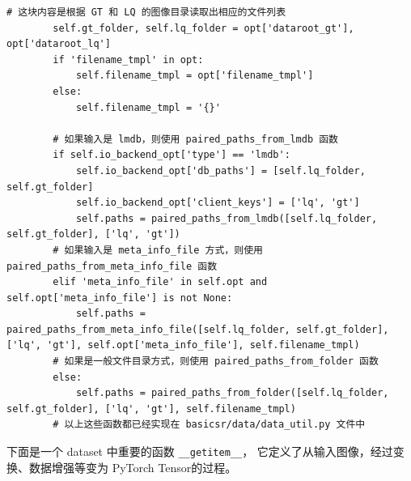 \documentclass[../main.tex]{subfiles}
\begin{document}
\begin{verbatim}
# 这块内容是根据 GT 和 LQ 的图像目录读取出相应的文件列表
        self.gt_folder, self.lq_folder = opt['dataroot_gt'], opt['dataroot_lq']
        if 'filename_tmpl' in opt:
            self.filename_tmpl = opt['filename_tmpl']
        else:
            self.filename_tmpl = '{}'

        # 如果输入是 lmdb，则使用 paired_paths_from_lmdb 函数
        if self.io_backend_opt['type'] == 'lmdb':
            self.io_backend_opt['db_paths'] = [self.lq_folder, self.gt_folder]
            self.io_backend_opt['client_keys'] = ['lq', 'gt']
            self.paths = paired_paths_from_lmdb([self.lq_folder, self.gt_folder], ['lq', 'gt'])
        # 如果输入是 meta_info_file 方式，则使用 paired_paths_from_meta_info_file 函数
        elif 'meta_info_file' in self.opt and self.opt['meta_info_file'] is not None:
            self.paths = paired_paths_from_meta_info_file([self.lq_folder, self.gt_folder], ['lq', 'gt'], self.opt['meta_info_file'], self.filename_tmpl)
        # 如果是一般文件目录方式，则使用 paired_paths_from_folder 函数
        else:
            self.paths = paired_paths_from_folder([self.lq_folder, self.gt_folder], ['lq', 'gt'], self.filename_tmpl)
        # 以上这些函数都已经实现在 basicsr/data/data_util.py 文件中
\end{verbatim}

下面是一个 dataset 中重要的函数 \texttt{\_\_getitem\_\_}， 它定义了从输入图像，经过变换、数据增强等变为 PyTorch Tensor的过程。
\end{document}
